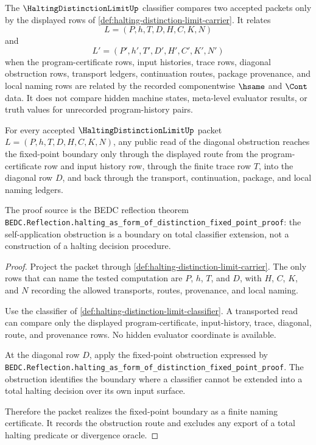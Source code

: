 \begin{definition}
\label{def:halting-distinction-limit-classifier}
The $\HaltingDistinctionLimitUp$ classifier compares two accepted packets only by the displayed rows of \autoref{def:halting-distinction-limit-carrier}. It relates
$$
L=(P,h,T,D,H,C,K,N)
$$
and
$$
L'=(P',h',T',D',H',C',K',N')
$$
when the program-certificate rows, input histories, trace rows, diagonal obstruction rows, transport ledgers, continuation routes, package provenance, and local naming rows are related by the recorded componentwise $\hsame$ and $\Cont$ data. It does not compare hidden machine states, meta-level evaluator results, or truth values for unrecorded program-history pairs.
\end{definition}

\begin{theorem}
\label{thm:halting-distinction-limit-fixed-point-boundary}
For every accepted $\HaltingDistinctionLimitUp$ packet $L=(P,h,T,D,H,C,K,N)$, any public read of the diagonal obstruction reaches the fixed-point boundary only through the displayed route from the program-certificate row and input history row, through the finite trace row $T$, into the diagonal row $D$, and back through the transport, continuation, package, and local naming ledgers.

The proof source is the BEDC reflection theorem \texttt{BEDC.Reflection.halting\_as\_form\_of\_distinction\_fixed\_point\_proof}: the self-application obstruction is a boundary on total classifier extension, not a construction of a halting decision procedure.
\end{theorem}
\begin{proof}
Project the packet through \autoref{def:halting-distinction-limit-carrier}. The only rows that can name the tested computation are $P$, $h$, $T$, and $D$, with $H$, $C$, $K$, and $N$ recording the allowed transports, routes, provenance, and local naming.

Use the classifier of \autoref{def:halting-distinction-limit-classifier}. A transported read can compare only the displayed program-certificate, input-history, trace, diagonal, route, and provenance rows. No hidden evaluator coordinate is available.

At the diagonal row $D$, apply the fixed-point obstruction expressed by \texttt{BEDC.Reflection.halting\_as\_form\_of\_distinction\_fixed\_point\_proof}. The obstruction identifies the boundary where a classifier cannot be extended into a total halting decision over its own input surface.

Therefore the packet realizes the fixed-point boundary as a finite naming certificate. It records the obstruction route and excludes any export of a total halting predicate or divergence oracle.
\end{proof}

